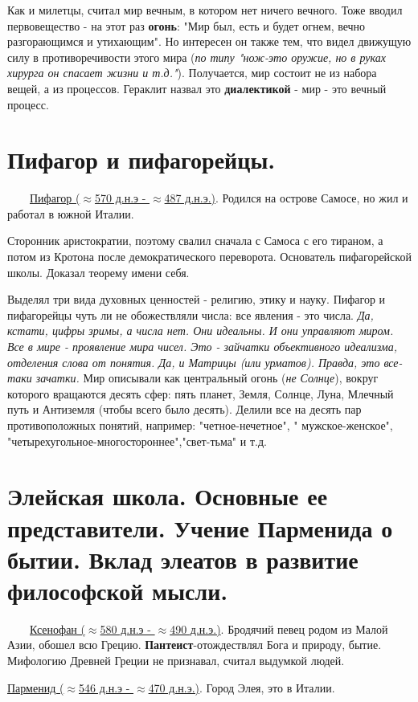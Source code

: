 \documentclass[12pt,a4paper]{article}
\begin{document}
Как и милетцы, считал мир вечным, в котором нет ничего вечного. Тоже вводил первовещество - на этот раз \textbf{огонь}: "Мир был, есть и будет огнем, вечно разгорающимся и утихающим". Но интересен он также тем, что видел движущую силу в противоречивости этого мира (\textit{по типу "нож-это оружие, но в руках хирурга он спасает жизни и т.д."}). Получается, мир состоит не из набора вещей, а из процессов. Гераклит назвал это \textbf{диалектикой} - мир - это вечный процесс. 

\section{Пифагор и пифагорейцы.}
\ \ \ \
\underline{Пифагор ($\approx$570 д.н.э - $\approx$487 д.н.э.)}. Родился на острове Самосе, но жил и работал в южной Италии.

Сторонник аристократии, поэтому свалил сначала с Самоса с его тираном, а потом из Кротона после демократического переворота.
Основатель пифагорейской школы. Доказал теорему имени себя.

Выделял три вида духовных ценностей - религию, этику и науку. Пифагор и пифагорейцы чуть ли не обожествляли числа: все явления - это числа. \textit{Да, кстати, цифры зримы, а числа нет. Они идеальны. И они управляют миром. Все в мире - проявление мира чисел. Это - зайчатки объективного идеализма, отделения слова от понятия. Да, и Матрицы (или урматов). Правда, это все-таки зачатки.} Мир описывали как центральный огонь (\textit{не Солнце}), вокруг которого вращаются десять сфер: пять планет, Земля, Солнце, Луна, Млечный путь и Антиземля (чтобы всего было десять). Делили все на десять пар противоположных понятий, например: "четное-нечетное", " мужское-женское", "четырехугольное-многостороннее","свет-тьма" и т.д.

\section{Элейская школа. Основные ее представители. Учение Парменида о бытии. Вклад элеатов в развитие философской мысли.}
\ \ \ \
\underline{Ксенофан ($\approx$580 д.н.э - $\approx$490 д.н.э.)}. Бродячий певец родом из Малой Азии, обошел всю Грецию. \textbf{Пантеист}-отождествлял Бога и природу, бытие. Мифологию Древней Греции не признавал, считал выдумкой людей.

\underline{Парменид ($\approx$546 д.н.э - $\approx$470 д.н.э.)}. Город Элея, это в Италии.
\end{document}
